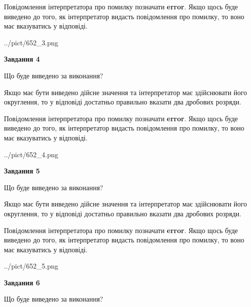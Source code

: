 \documentclass[12pt, ukrainian]{article}
\begin{document}
{\begin {Large}
Повідомлення інтерпретатора про помилку позначати \textbf{error}.
Якщо щось буде виведено до того, як інтерпретатор видасть повідомлення про помилку, 
то воно має вказуватись у відповіді. \par

\begin{center}
	{../pict/652_3.png}
\end{center}
\newpage

{\begin {center}\textbf{Завдання 4}\end {center}}\par
Що буде виведено за виконання? \par

Якщо має бути виведено дійсне значення та інтерпретатор має здійснювати його округлення, 
то у відповіді достатньо правильно вказати два дробових розряди.

Повідомлення інтерпретатора про помилку позначати \textbf{error}.
Якщо щось буде виведено до того, як інтерпретатор видасть повідомлення про помилку, 
то воно має вказуватись у відповіді. \par

\begin{center}
	{../pict/652_4.png}
\end{center}
\newpage

{\begin {center}\textbf{Завдання 5}\end {center}}\par
Що буде виведено за виконання? \par

Якщо має бути виведено дійсне значення та інтерпретатор має здійснювати його округлення, 
то у відповіді достатньо правильно вказати два дробових розряди.

Повідомлення інтерпретатора про помилку позначати \textbf{error}.
Якщо щось буде виведено до того, як інтерпретатор видасть повідомлення про помилку, 
то воно має вказуватись у відповіді. \par

\begin{center}
	{../pict/652_5.png}
\end{center}
\newpage

{\begin {center}\textbf{Завдання 6}\end {center}}\par
Що буде виведено за виконання? \par


\end{Large}}
\end{document}

